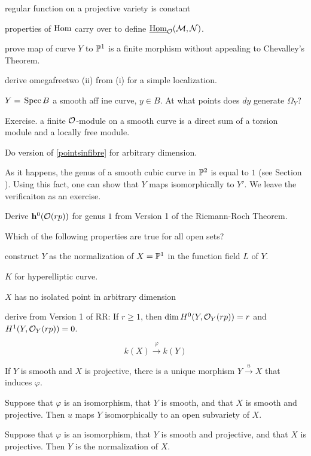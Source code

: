 \documentclass[leqno]{book}
\theoremstyle{definition}%
\numberwithin{equation}{section}
\theoremstyle{theorem} %
\begin{document}
\bs

regular function on a projective variety is constant

\bs

properties of $\operatorname{Hom}$ carry over to define $\uHom_\co(\cm,\cn)$.

\bs

prove map of curve $Y$ to $\mathbb{P}^1$ is a finite morphism without
appealing to Chevalley's Theorem.

\bs

derive omegafreetwo (ii) from (i) for a simple localization.

\bs

$Y = \,\operatorname{Spec} B$ a smooth aff ine curve, $y \in B$.  At what points does
$dy$ generate $\Omega_Y$?

\bs

Exercise.  a finite $\co$-module on a smooth curve is a direct sum of
a torsion module and a locally free module.

\bs

Do version of \ref{pointsinfibre} for arbitrary dimension.


\bs
As it happens, the genus of a smooth cubic curve in $\mathbb{P}^2$ is equal to $1$
(see Section ). 
Using this fact, one can show that $Y$
maps isomorphically to $Y'$.  We leave the verificaiton as an exercise.

\bs\ms
Derive $\hh^0(\co(rp))$ for genus $1$  from Version 1 of the
Riemann-Roch Theorem.

\bs
Which of the following properties are true for all open sets?

\bs construct $Y$ as the normalization of
$X=\mathbb{P}^1$ in the function field $L$ of $Y$. 

\bs
$K$ for hyperelliptic curve.

\bs
$X$ has no isolated point in arbitrary dimension

\bs
derive from Version 1 of RR: If $r \geq 1$, then $\dim
H^0(Y,\co_Y(rp)) = r$ and $H^1(Y,\co_Y(rp)) = 0$.


\bs
$$k(X) \stackrel{\varphi}\longrightarrow k(Y)$$


 If $Y$ is smooth and $X$ is projective, there is a
unique morphism $Y \stackrel{u}\longrightarrow X$ that induces
$\varphi$.

 Suppose that $\varphi$ is an isomorphism, that $Y$ is
smooth, and that $X$ is smooth and projective.  Then $u$ maps $Y$
isomorphically to an open subvariety of $X$.

 Suppose that $\varphi$ is an isomorphism, that $Y$ is
smooth and projective, and that $X$ is projective. Then $Y$ is the
normalization of $X$.
 
\end{document}

